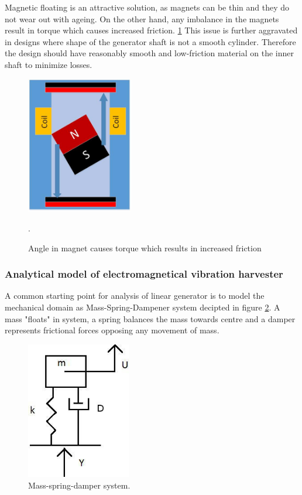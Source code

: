 Magnetic floating is an attractive solution, as magnets can be thin and they do not wear out with ageing. On the other hand, any imbalance in the magnets result in torque which causes increased friction. \ref{fig:lg_torgue} This issue is further aggravated in designs where shape of the generator shaft is not a smooth cylinder. Therefore the design should have reasonably smooth and low-friction material on the inner shaft to minimize losses.

\begin{figure}[htb]
\begin{center}
\includegraphics[height=6cm]{images/own_dwg/generator_torgue}
\end{center}
\caption{Angle in magnet causes torque which results in increased friction}.
\label{fig:lg_torgue}
\end{figure}



\subsubsection{Analytical model of electromagnetical vibration harvester}
A common starting point for analysis of linear generator is to model the mechanical domain as Mass-Spring-Dampener system decipted in figure \ref{MSD}. A mass "floats" in system, a spring balances the mass towards centre and a damper represents frictional forces opposing any movement of mass. 

\begin{figure}[htb]
\begin{center}
\includegraphics[height=6cm]{images/own_dwg/MSD.jpg}
\end{center}
\caption{\label{MSD} Mass-spring-damper system.}
\end{figure}

